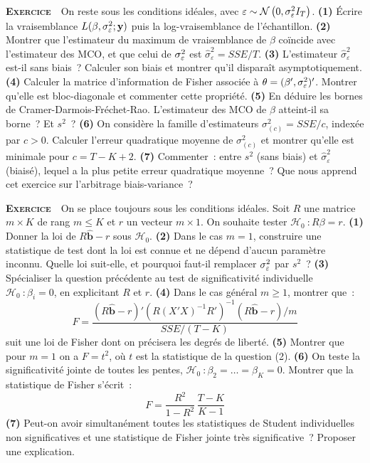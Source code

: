 \documentclass[10pt,a4paper,notitlepage]{article}
\newcounter{xnumber}
\newcommand{\exercice}{\refstepcounter{xnumber}\textsc{\textbf{Exercice}} \textbf{\thexnumber}\,\,}
\newcommand{\question}[1]{\textbf{(#1)}}
\begin{document}
\bigskip

\exercice\label{ex:vraisemblance} On reste sous les conditions idéales, avec
$\varepsilon\sim\mathcal N\left(0,\sigma_{\varepsilon}^2 I_T\right)$. \question{1} Écrire la vraisemblance
$L(\beta,\sigma_{\varepsilon}^2;\mathbf y)$ puis la log-vraisemblance de l'échantillon.
\question{2} Montrer que l'estimateur du maximum de vraisemblance de $\beta$
coïncide avec l'estimateur des MCO, et que celui de $\sigma_{\varepsilon}^2$ est
$\hat\sigma^2_{\varepsilon} = SSE/T$. \question{3} L'estimateur
$\hat\sigma^2_{\varepsilon}$ est-il sans biais~? Calculer son biais et montrer
qu'il disparaît asymptotiquement. \question{4} Calculer la matrice d'information
de Fisher associée à $\theta = (\beta', \sigma_{\varepsilon}^2)'$. Montrer qu'elle est
bloc-diagonale et commenter cette propriété. \question{5} En déduire les bornes
de Cramer-Darmois-Fréchet-Rao. L'estimateur des MCO de $\beta$ atteint-il sa
borne~? Et $s^2$~? \question{6} On considère la famille d'estimateurs
$\sigma^2_{(c)} = SSE/c$, indexée par $c>0$. Calculer l'erreur quadratique
moyenne de $\sigma^2_{(c)}$ et montrer qu'elle est minimale pour
$c = T-K+2$. \question{7} Commenter~: entre $s^2$ (sans biais) et
$\hat\sigma^2_{\varepsilon}$ (biaisé), lequel a la plus petite erreur
quadratique moyenne~? Que nous apprend cet exercice sur l'arbitrage
biais-variance~?\newline

\bigskip

\exercice\label{ex:tests} On se place toujours sous les conditions idéales. Soit $R$ une matrice
$m\times K$ de rang $m\leq K$ et $r$ un vecteur $m\times 1$. On souhaite tester
$\mathcal H_0~: R\beta = r$. \question{1} Donner la loi
de $R\hat{\mathbf b}-r$ sous $\mathcal H_0$. \question{2} Dans le cas $m=1$,
construire une statistique de test dont la loi est connue et ne dépend d'aucun
paramètre inconnu. Quelle loi suit-elle, et pourquoi faut-il remplacer $\sigma_{\varepsilon}^2$
par $s^2$~? \question{3} Spécialiser la question précédente au test de
significativité individuelle $\mathcal H_0~: \beta_i = 0$, en explicitant $R$
et $r$. \question{4} Dans le cas général $m\geq 1$, montrer que~:
\[
  F = \frac{\left(R\hat{\mathbf b}-r\right)'\left(R(X'X)^{-1}R'\right)^{-1}\left(R\hat{\mathbf b}-r\right)/m}{SSE/(T-K)}
\]
suit une loi de Fisher dont on précisera les degrés de liberté. \question{5}
Montrer que pour $m=1$ on a $F = t^2$, où $t$ est la statistique de la question
(2). \question{6} On teste la significativité jointe de toutes les pentes,
$\mathcal H_0~: \beta_2 = \dots = \beta_K = 0$. Montrer que la statistique de
Fisher s'écrit~:
\[
  F = \frac{R^2}{1-R^2}\,\frac{T-K}{K-1}
\]
\question{7} Peut-on avoir simultanément toutes les statistiques de Student
individuelles non significatives et une statistique de Fisher jointe très
significative~? Proposer une explication.\newline
\end{document}
